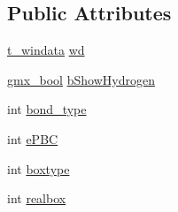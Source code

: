 \subsection*{\-Public \-Attributes}
\begin{DoxyCompactItemize}
\item 
\hyperlink{structt__windata}{t\-\_\-windata} \hyperlink{structt__molwin_a17359f1f9fd919f2c4dd92e799952334}{wd}
\item 
\hyperlink{include_2types_2simple_8h_a8fddad319f226e856400d190198d5151}{gmx\-\_\-bool} \hyperlink{structt__molwin_aa02a11f4bf1272e8b8a14bf9bdb9dc8e}{b\-Show\-Hydrogen}
\item 
int \hyperlink{structt__molwin_aacbbc705800534ed290243a328becb71}{bond\-\_\-type}
\item 
int \hyperlink{structt__molwin_a3faf1fc4cff4ea2ba036f39587b025e5}{e\-P\-B\-C}
\item 
int \hyperlink{structt__molwin_a379b4fee0d4e5d4271b8bbc347ef4016}{boxtype}
\item 
int \hyperlink{structt__molwin_a3106e44cac2342a4a82efb7f05a52dbf}{realbox}
\end{DoxyCompactItemize}


